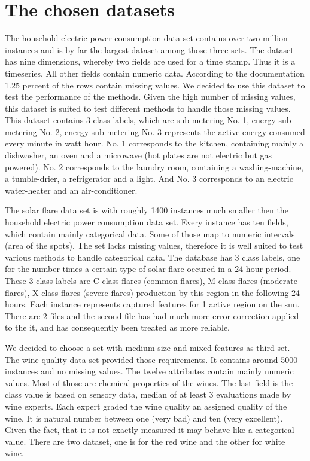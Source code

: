 \documentclass[a4paper]{article}
\begin{document}
\section{The chosen datasets}
The household electric power consumption data set contains over two million
instances and is by far the largest dataset among those three sets. The dataset
has nine dimensions, whereby two fields are used for a time stamp. Thus it is a
timeseries. All other fields contain numeric data. According to the
documentation 1.25 percent of the rows contain missing values. We decided to use
this dataset to test the performance of the methods. Given the high number of
missing values, this dataset is suited to test different methods to handle those
missing values. This dataset contains 3 class labels, which are sub-metering No. 1, 
energy sub-metering No. 2,  energy sub-metering No. 3 represents the active energy 
consumed every minute in watt hour. No. 1 corresponds to the kitchen, containing mainly 
a dishwasher, an oven and a microwave (hot plates are not electric but gas powered). 
No. 2 corresponds to the laundry room, containing a washing-machine, a tumble-drier, 
a refrigerator and a light. And No. 3 corresponds to an electric water-heater and an air-conditioner. 

The solar flare data set is with roughly 1400 instances much smaller then the
household electric power consumption data set. Every instance has ten fields,
which contain mainly categorical data. Some of those map to numeric intervals
(area of the spots). The set lacks missing values, therefore it is well suited
to test various methods to handle categorical data. The database has 3 class labels, 
one for the number times a certain type of solar flare occured in a 24 hour period. 
These 3 class labels are C-class flares (common flares), M-class flares (moderate flares), 
X-class flares (severe flares) production by this region in the following 24 hours. 
Each instance represents captured features for 1 active region on the sun. 
There are 2 files and the second file has had much more error correction applied to the it, 
and has consequently been treated as more reliable. 

We decided to choose a set with medium size and mixed features as third set. The
wine quality data set provided those requirements. It contains around 5000
instances and no missing values. The twelve attributes contain mainly numeric
values. Most of those are chemical properties of the wines. The last field is
the class value is based on sensory data, median of at least 3 evaluations made by wine experts. 
Each expert graded the wine quality  an assigned quality of the wine. It is natural number 
between one (very bad) and ten (very excellent).
Given the fact, that it is not exactly measured it may behave like a
categorical value. There are two dataset, one is for the red wine and the other for white wine.
\end{document}
